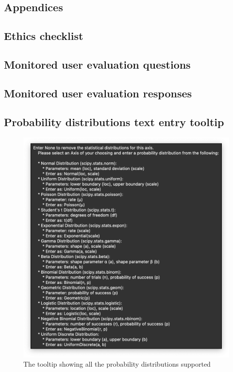 \documentclass{l4proj}
\begin{document}
\begin{appendices}

\chapter{Appendices}\label{appendices}




\section{Ethics checklist}
    
     \label{ethics-checklist}
\section{Monitored user evaluation questions}
    
     \label{survey-questions}
\section{Monitored user evaluation responses}
    
     \label{fig:survey-results}
\section{Probability distributions text entry tooltip}
 \begin{figure} [H]
        \centering
        \includegraphics[width=1\linewidth]{dissertation//images//myFigures//appendix/prob.png}
        \caption{The tooltip showing all the probability distributions supported}
        \label{fig:prob-tooltip}
    \end{figure}

\end{appendices}
\end{document}
